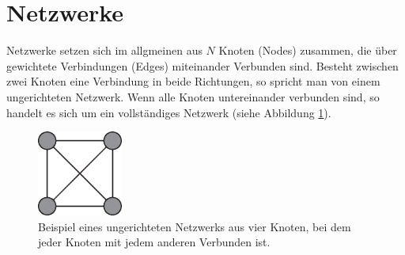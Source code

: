 
\section{Netzwerke}
Netzwerke setzen sich im allgmeinen aus $N$ Knoten (Nodes) zusammen, die über gewichtete Verbindungen (Edges) miteinander Verbunden sind. Besteht zwischen zwei Knoten eine Verbindung in beide Richtungen, so spricht man von einem ungerichteten Netzwerk. Wenn alle Knoten untereinander verbunden sind, so handelt es sich um ein vollständiges Netzwerk (siehe Abbildung \ref{fig:GraphBsp}).

\begin{figure}[t]
	 \centering
	\includegraphics[width=0.25\textwidth]{abb/misc/GraphBsp.eps}
	\caption[Ungerichteres Netzwerk]{Beispiel eines ungerichteten Netzwerks aus vier Knoten, bei dem jeder Knoten mit jedem anderen Verbunden ist.}
	\label{fig:GraphBsp}
\end{figure}



